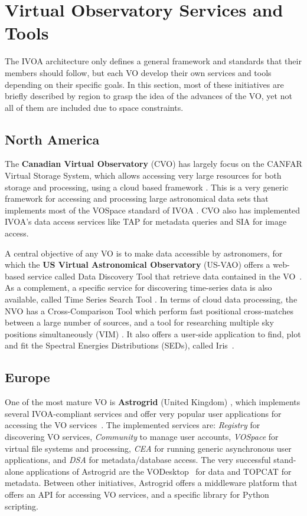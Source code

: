 \section{Virtual Observatory Services and Tools}

The IVOA architecture only defines a general framework and
standards that their members should follow, but each VO develop
their own services and tools depending on their specific goals.
In this section, most of these initiatives are briefly
described by region to grasp the idea of the advances of
the VO, yet not all of them are included due to space 
constraints.

\subsection{North America}

The \textbf{Canadian Virtual Observatory} (CVO) has largely focus on the CANFAR Virtual Storage
System, which
allows accessing very large resources for both storage and processing, 
using a cloud based framework \cite{Gaudet2011}. 
This is a very generic framework for accessing and processing 
large astronomical data sets that implements most of the
VOSpace standard of IVOA \cite{Graham2007a}. CVO also has implemented
IVOA's data access services like TAP for metadata queries 
and SIA for image access.

A central objective of any VO is to make data accessible by astronomers,
for which the \textbf{US Virtual Astronomical Observatory} (US-VAO) 
offers a web-based service called Data Discovery Tool 
that retrieve data contained in the VO~\cite{McGlynn2013}. 
As a complement, a specific service for discovering time-series data
is also available, called Time Series Search Tool \cite{Graham2012}.
In terms of cloud data processing, the NVO has a Cross-Comparison Tool 
which perform fast positional cross-matches between a large number of 
sources, and a tool for researching multiple sky positions simultaneously (VIM)
\cite{Hanisch2012}.
It also offers a user-side application to find, plot and fit the
Spectral Energies Distributions (SEDs), called Iris~\cite{Laurino2013}.

\subsection{Europe}

One of the most mature VO is \textbf{Astrogrid} (United Kingdom)
\cite{Lawrence2002}, which implements
several IVOA-compliant services and offer very popular user applications
for accessing the VO services~\cite{Lawence2009}.
The implemented services are: \emph{Registry}
for discovering VO services, \emph{Community} to manage user accounts, 
\emph{VOSpace} for virtual file systems and processing, \emph{CEA} for running
generic asynchronous user applications, and \emph{DSA} for metadata/database
access. The very successful stand-alone applications of Astrogrid are 
the VODesktop~\cite{Tedds2008} for data and
TOPCAT \cite{Graham2007} for metadata.
Between other initiatives, Astrogrid offers a middleware platform 
that offers an API for accessing VO services, and a specific 
library for Python scripting.

